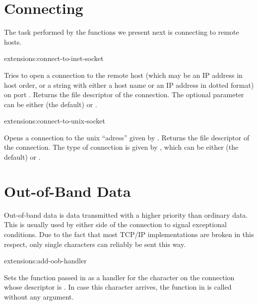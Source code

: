 \section{Connecting}

The task performed by the functions we present next is connecting to
remote hosts.

\begin{defun}{extensions:}{connect-to-inet-socket}{%
    }
  
  Tries to open a connection to the remote host  (which may
  be an IP address in host order, or a string with either a host name
  or an IP address in dotted format) on port . Returns the
  file descriptor of the connection.  The optional parameter
   can be either  (the default) or .

\end{defun}

\begin{defun}{extensions:}{connect-to-unix-socket}{%
    }
  
  Opens a connection to the unix ``adress'' given by .
  Returns the file descriptor of the connection.  The type of
  connection is given by , which can be either 
  (the default) or .

\end{defun}

\section{Out-of-Band Data}
\label{internet-oob}

Out-of-band data is data transmitted with a higher priority than
ordinary data. This is usually used by either side of the connection
to signal exceptional conditions. Due to the fact that most TCP/IP
implementations are broken in this respect, only single characters can
reliably be sent this way.

\begin{defun}{extensions:}{add-oob-handler}{%
    }
  
  Sets the function passed in  as a handler for the
  character  on the connection whose descriptor is .
  In case this character arrives, the function in  is
  called without any argument.

\end{defun}

